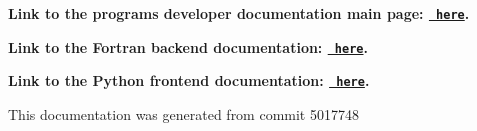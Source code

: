 {\bfseries{Link to the program\textquotesingle{}s developer documentation main page\+: \href{https://joegilkes.github.io/PX915-Docs/}{\texttt{ here}}.}}

{\bfseries{Link to the Fortran backend documentation\+: \href{https://joegilkes.github.io/PX915-Docs/fortran/docs/index.html}{\texttt{ here}}.}}

{\bfseries{Link to the Python frontend documentation\+: \href{https://joegilkes.github.io/PX915-Docs/python/docs/index.html}{\texttt{ here}}.}}

This documentation was generated from commit 5017748 